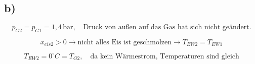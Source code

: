 

\subsection*{b)}

\[
p_{G2} = p_{G1} = 1,4 \, \text{bar}, \quad \text{Druck von außen auf das Gas hat sich nicht geändert.}
\]

\[
x_{eis2} > 0 \rightarrow \text{nicht alles Eis ist geschmolzen} \rightarrow T_{EW2} = T_{EW1}
\]

\[
T_{EW2} = 0^\circ C = T_{G2}, \quad \text{da kein Wärmestrom, Temperaturen sind gleich}
\]